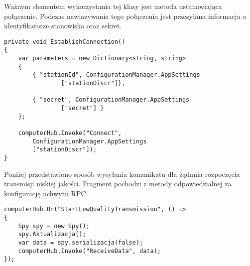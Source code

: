 Ważnym elementem wykorzystania tej klasy jest metoda ustanawiająca połączenie. Podczas nawiazywania tego połączenia jest przesyłana informacja o identyfikatorze stanowiska oraz sekret.


\begin{lstlisting}[frame=single,captionpos=b,
    caption={Fragment kodu metody nawiązującej połączenie},
    label={lst:kod1},
    style=sharpc]
private void EstablishConnection()
{
    var parameters = new Dictionary<string, string>
    {
        { "stationId", ConfigurationManager.AppSettings
                ["stationDiscr"]},
                
        { "secret", ConfigurationManager.AppSettings
                ["secret"] }
    };
    
    computerHub.Invoke("Connect", 
        ConfigurationManager.AppSettings
        ["stationDiscr"]);
}
\end{lstlisting}

\newpage
Poniżej przedstawiono sposób wysyłania komunikatu dla żądania rozpoczęcia transmisji niskiej jakości. Fragment pochodzi z metody odpowiedzialnej za konfigurację uchwytu RPC.

\begin{lstlisting}[frame=single,captionpos=b,
    caption={Fragment kodu przedstawiający wysyłanie komunikatu dla rozpoczęcia transmisji niskiej jakości.},
    label={lst:kod1},
    style=sharpc]
computerHub.On("StartLowQualityTransmission", () =>
{
    Spy spy = new Spy();
    spy.Aktualizacja();
    var data = spy.serializacja(false);
    computerHub.Invoke("ReceiveData", data);
});
\end{lstlisting}






